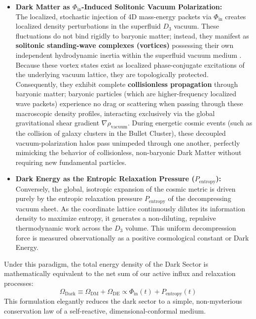 \documentclass[11pt,a4paper]{article}
\theoremstyle{plain}
\theoremstyle{definition}
\theoremstyle{remark}
\begin{document}
\begin{itemize}
    \item \textbf{Dark Matter as $\Phi_{\text{in}}$-Induced Solitonic Vacuum Polarization:} \\
    The localized, stochastic injection of 4D mass-energy packets via $\Phi_{\text{in}}$ creates localized density perturbations in the superfluid $D_3$ vacuum. These fluctuations do not bind rigidly to baryonic matter; instead, they manifest as \textbf{solitonic standing-wave complexes (vortices)} possessing their own independent hydrodynamic inertia within the superfluid vacuum medium \cite{volovik2003}. Because these vortex states exist as localized phase-conjugate excitations of the underlying vacuum lattice, they are topologically protected. Consequently, they exhibit complete \textbf{collisionless propagation} through baryonic matter; baryonic particles (which are higher-frequency localized wave packets) experience no drag or scattering when passing through these macroscopic density profiles, interacting exclusively via the global gravitational shear gradient $\nabla\rho_{\text{vacuum}}$. During energetic cosmic events (such as the collision of galaxy clusters in the Bullet Cluster), these decoupled vacuum-polarization halos pass unimpeded through one another, perfectly mimicking the behavior of collisionless, non-baryonic Dark Matter without requiring new fundamental particles.

    \item \textbf{Dark Energy as the Entropic Relaxation Pressure ($P_{\text{entropy}}$):} \\
    Conversely, the global, isotropic expansion of the cosmic metric is driven purely by the entropic relaxation pressure $P_{\text{entropy}}$ of the decompressing vacuum sheet. As the coordinate lattice continuously dilutes its information density to maximize entropy, it generates a non-diluting, repulsive thermodynamic work across the $D_3$ volume. This uniform decompression force is measured observationally as a positive cosmological constant or Dark Energy.
\end{itemize}

Under this paradigm, the total energy density of the Dark Sector is mathematically equivalent to the net sum of our active influx and relaxation processes:
\begin{equation}
\Omega_{\text{Dark}} \equiv \Omega_{\text{DM}} + \Omega_{\text{DE}} \propto \Phi_{\text{in}}(t) + P_{\text{entropy}}(t)
\end{equation}
This formulation elegantly reduces the dark sector to a simple, non-mysterious conservation law of a self-reactive, dimensional-conformal medium.
\end{document}
